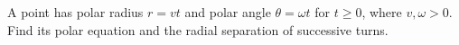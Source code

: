 A point has polar radius $r=vt$ and polar angle $\theta=\omega t$ for $t\ge0$, where $v,\omega>0$. Find its polar equation and the radial separation of successive turns.
